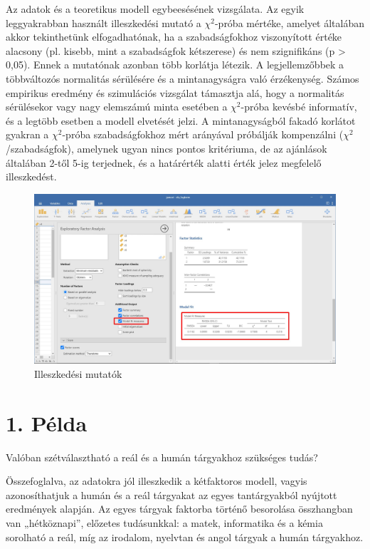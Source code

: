 \documentclass[
  letterpaper,
]{krantz}
\begin{document}
Az adatok és a teoretikus modell egybeesésének vizsgálata. Az egyik
leggyakrabban használt illeszkedési mutató a \(\chi^2\)-próba mértéke,
amelyet általában akkor tekinthetünk elfogadhatónak, ha a
szabadságfokhoz viszonyított értéke alacsony (pl. kisebb, mint a
szabadságfok kétszerese) és nem szignifikáns (p \textgreater{} 0,05).
Ennek a mutatónak azonban több korlátja létezik. A legjellemzőbbek a
többváltozós normalitás sérülésére és a mintanagyságra való érzékenység.
Számos empirikus eredmény és szimulációs vizsgálat támasztja alá, hogy a
normalitás sérülésekor vagy nagy elemszámú minta esetében a
\(\chi^2\)-próba kevésbé informatív, és a legtöbb esetben a modell
elvetését jelzi. A mintanagyságból fakadó korlátot gyakran a
\(\chi^2\)-próba szabadságfokhoz mért arányával próbálják kompenzálni
(\(\chi^2\)/szabadságfok), amelynek ugyan nincs pontos kritériuma, de az
ajánlások általában 2-től 5-ig terjednek, és a határérték alatti érték
jelez megfelelő illeszkedést.

\begin{figure}

{\centering \includegraphics{./images/efa_fogkrem_05.jpg}

}

\caption{Illeszkedési mutatók}

\end{figure}

\hypertarget{puxe9lda-3}{%
\section{1. Példa}\label{puxe9lda-3}}

Valóban szétválasztható a reál és a humán tárgyakhoz szükséges tudás?

Összefoglalva, az adatokra jól illeszkedik a kétfaktoros modell, vagyis
azonosíthatjuk a humán és a reál tárgyakat az egyes tantárgyakból
nyújtott eredmények alapján. Az egyes tárgyak faktorba történő
besorolása összhangban van „hétköznapi'', előzetes tudásunkkal: a matek,
informatika és a kémia sorolható a reál, míg az irodalom, nyelvtan és
angol tárgyak a humán tárgyakhoz.
\end{document}
